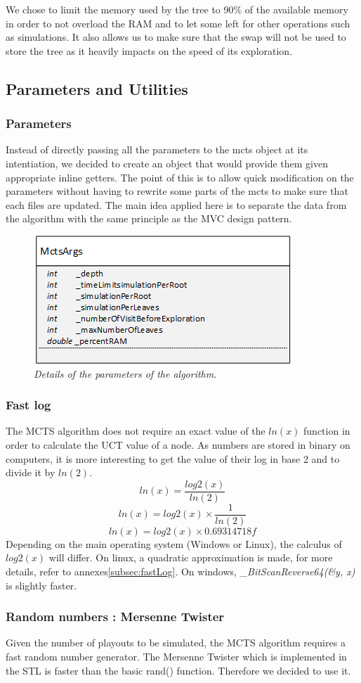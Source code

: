 We chose to limit the memory used by the tree to 90\% of the available memory in order to not overload the RAM and to let some left for other operations such as simulations. It also allows us to make sure that the swap will not be used to store the tree as it heavily impacts on the speed of its exploration.
\newpage
\subsection{Parameters and Utilities}
\subsubsection{Parameters}
Instead of directly passing all the parameters to the mcts object at its intentiation, we decided to create an object that would provide them given appropriate inline getters. The point of this is to allow quick modification on the parameters without having to rewrite some parts of the mcts to make sure that each files are updated. The main idea applied here is to separate the data from the algorithm with the same principle as the MVC design pattern.
\begin{figure}[H] 
\centerline{\includegraphics[scale=0.8]{Data_Structure/Img/MctsArgs.png}}
\caption{\label{fig:mctsargsuml}\textit{Details of the parameters of the algorithm}.}
\end{figure}

\subsubsection{Fast log}
The MCTS algorithm does not require an exact value of the \ensuremath{ln(x)} function in order to calculate the UCT value of a node. As numbers are stored in binary on computers, it is more interesting to get the value of their log in base 2 and to divide it by \ensuremath{ln(2)}. 
\begin{equation}
ln(x) = \frac{log2(x)}{ln(2)}
\end{equation}
\begin{equation}
ln(x) = log2(x) \times \frac{1}{ln(2)}
\end{equation}
\begin{equation}
ln(x) = log2(x) \times 0.69314718f
\end{equation}
Depending on the main operating system (Windows or Linux), the calculus of \ensuremath{log2(x)} will differ. On linux, a quadratic approximation is made, for more details, refer to annexes\ref{subsec:fastLog}. On windows, \textit{\_BitScanReverse64(\&y, x)} is slightly faster. 

\subsubsection{Random numbers : Mersenne Twister}
Given the number of playouts to be simulated, the MCTS algorithm requires a fast random number generator. The Mersenne Twister which is implemented in the STL is faster than the basic rand() function. Therefore we decided to use it.


